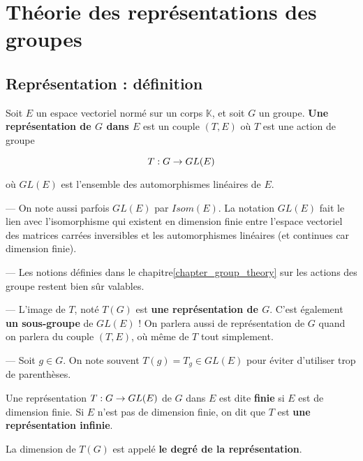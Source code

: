 \chapter{Théorie des représentations des groupes}

\section{Représentation : définition}
\begin{definition}
	Soit $E$ un espace vectoriel normé sur un corps $\mathbb{K}$, et soit $G$ un groupe.
	\textbf{Une représentation de $G$ dans $E$} est un couple $(T, E)$ où $T$
	est une action de groupe

	\begin{equation}
		T : G \rightarrow GL(E)
		\label{definition_representation}
	\end{equation}

	où $GL(E)$ est l'ensemble des automorphismes linéaires de $E$.
\end{definition}

\begin{remarque}
	--- On note aussi parfois $GL(E)$ par $Isom(E)$. La notation $GL(E)$ fait le
	lien avec l'isomorphisme qui existent en dimension finie entre l'espace
	vectoriel des matrices carrées inversibles et les automorphismes linéaires
	(et continues car dimension finie).

	--- Les notions définies dans le chapitre\ref{chapter_group_theory} sur les
	actions des groupe restent bien sûr valables.

	--- L'image de $T$, noté $T(G)$ est \textbf{une représentation de $G$}.
	C'est également \textbf{un sous-groupe} de $GL(E)$ ! On parlera aussi de
	représentation de $G$ quand on parlera du couple $(T, E)$, où même de $T$
	tout simplement.

	--- Soit $g \in G$. On note souvent $T(g) = T_{g} \in GL(E)$ pour éviter
	d'utiliser trop de parenthèses.
\end{remarque}

\begin{definition}
	Une représentation $T : G \rightarrow GL(E)$ de $G$ dans $E$ est dite
	\textbf{finie} si $E$ est de dimension finie. Si $E$ n'est pas de dimension
	finie, on dit que $T$ est \textbf{une représentation infinie}.

	La dimension de $T(G)$ est appelé \textbf{le degré de la représentation}.
\end{definition}


